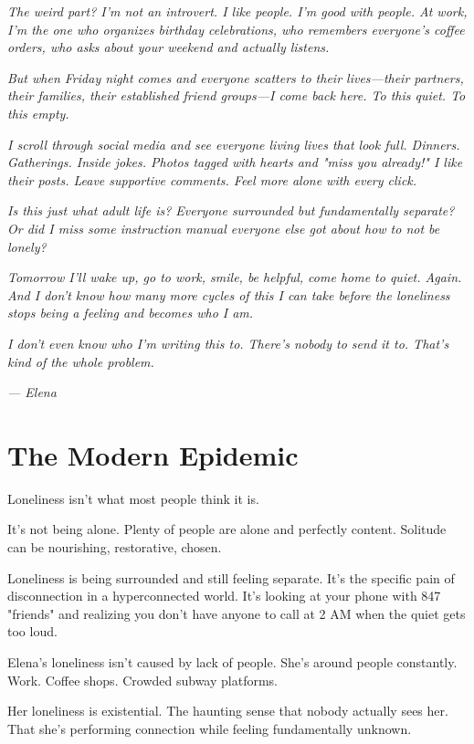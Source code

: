 \documentclass[11pt,twoside]{book}
\begin{document}
\textit{The weird part? I'm not an introvert. I like people. I'm good with people. At work, I'm the one who organizes birthday celebrations, who remembers everyone's coffee orders, who asks about your weekend and actually listens.}

\textit{But when Friday night comes and everyone scatters to their lives—their partners, their families, their established friend groups—I come back here. To this quiet. To this empty.}

\textit{I scroll through social media and see everyone living lives that look full. Dinners. Gatherings. Inside jokes. Photos tagged with hearts and "miss you already!" I like their posts. Leave supportive comments. Feel more alone with every click.}

\textit{Is this just what adult life is? Everyone surrounded but fundamentally separate? Or did I miss some instruction manual everyone else got about how to not be lonely?}

\textit{Tomorrow I'll wake up, go to work, smile, be helpful, come home to quiet. Again. And I don't know how many more cycles of this I can take before the loneliness stops being a feeling and becomes who I am.}

\textit{I don't even know who I'm writing this to. There's nobody to send it to. That's kind of the whole problem.}

\textit{— Elena}

\section*{The Modern Epidemic}

Loneliness isn't what most people think it is.

It's not being alone. Plenty of people are alone and perfectly content. Solitude can be nourishing, restorative, chosen.

Loneliness is being surrounded and still feeling separate. It's the specific pain of disconnection in a hyperconnected world. It's looking at your phone with 847 "friends" and realizing you don't have anyone to call at 2 AM when the quiet gets too loud.

Elena's loneliness isn't caused by lack of people. She's around people constantly. Work. Coffee shops. Crowded subway platforms.

Her loneliness is existential. The haunting sense that nobody actually sees her. That she's performing connection while feeling fundamentally unknown.
\end{document}
